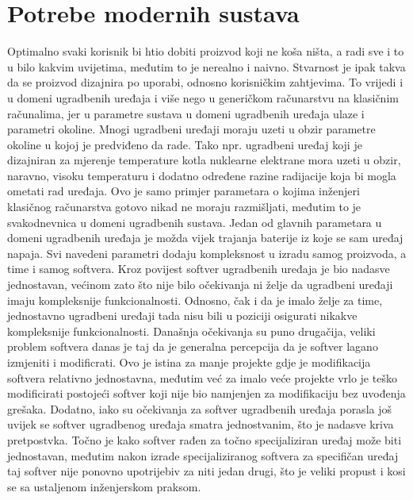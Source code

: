 \section{Potrebe modernih sustava}
Optimalno svaki korisnik bi htio dobiti proizvod koji ne koša ništa, a radi sve i to u bilo kakvim uvijetima, međutim to je nerealno i naivno. Stvarnost je ipak takva da se proizvod dizajnira po uporabi, odnosno korisničkim zahtjevima. To vrijedi i u domeni ugradbenih uređaja i više nego u generičkom računarstvu na klasičnim računalima, jer u parametre sustava u domeni ugradbenih uređaja ulaze i parametri okoline. Mnogi ugradbeni uređaji moraju uzeti u obzir parametre okoline u kojoj je predviđeno da rade. Tako npr. ugradbeni uređaj koji je dizajniran za mjerenje temperature kotla nuklearne elektrane mora uzeti u obzir, naravno, visoku temperaturu i dodatno određene razine radijacije koja bi mogla ometati rad uređaja. Ovo je samo primjer parametara o kojima inženjeri klasičnog računarstva gotovo nikad ne moraju razmišljati, međutim to je svakodnevnica u domeni ugradbenih sustava. Jedan od glavnih parametara u domeni ugradbenih uređaja je možda vijek trajanja baterije iz koje se sam uređaj napaja. Svi navedeni parametri dodaju kompleksnost u izradu samog proizvoda, a time i samog softvera. Kroz povijest softver ugradbenih uređaja je bio nadasve jednostavan, većinom zato što nije bilo očekivanja ni želje da ugradbeni uređaji imaju kompleksnije funkcionalnosti. Odnosno, čak i da je imalo želje za time, jednostavno ugradbeni uređaji tada nisu bili u poziciji osigurati nikakve kompleksnije funkcionalnosti. Današnja očekivanja su puno drugačija, veliki problem softvera danas je taj da je generalna percepcija da je softver lagano izmjeniti i modificrati. Ovo je istina za manje projekte gdje je modifikacija softvera relativno jednostavna, međutim već za imalo veće projekte vrlo je teško modificirati postojeći softver koji nije bio namjenjen za modifikaciju bez uvođenja grešaka. Dodatno, iako su očekivanja za softver ugradbenih uređaja porasla još uvijek se softver ugradbenog uređaja smatra jednostvanim, što je nadasve kriva pretpostvka. Točno je kako softver rađen za točno specijaliziran uređaj može biti jednostavan, međutim nakon izrade specijaliziranog softvera za specifičan uređaj taj softver nije ponovno upotrijebiv za niti jedan drugi, što je veliki propust i kosi se sa ustaljenom inženjerskom praksom. \\
